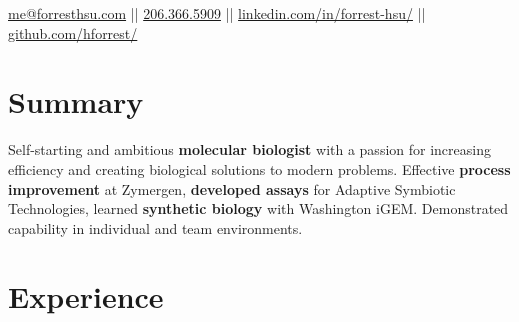 \documentclass[]{forrest-resume-interfont}
\begin{document}
%
%

\lastupdated

%
%


%
%

{
	\href{mailto:me@forresthsu.com}{me@forresthsu.com} || 
	\href{tel:2063665909}{206.366.5909} || 
	\href{https://www.linkedin.com/in/forrest-hsu/}{linkedin.com/in/forrest-hsu/} ||
	\href{https://github.com/HForrest/}{github.com/hforrest/}
}

%
%
\spacesep
\section{ Summary}
\raggedright 

Self-starting and ambitious \textbf{molecular biologist} with a passion for increasing efficiency and  creating biological solutions to modern problems. Effective \textbf{process improvement} at Zymergen, \textbf{developed assays} for Adaptive Symbiotic Technologies, learned \textbf{synthetic biology} with Washington iGEM. Demonstrated capability in individual and team environments.
 
\linesep



\section{ Experience}
\\
\end{document}
